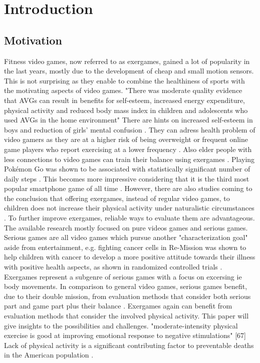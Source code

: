 \chapter{Introduction}
\label{ch:introduction}


\section{Motivation}
Fitness video games, now referred to as exergames, gained a lot of popularity in the last years, mostly due to the development of cheap and small motion sensors. This is not surprising as they enable to combine the healthiness of sports with the motivating aspects of video games.
"There was moderate quality evidence that AVGs can result in benefits for self-esteem, increased energy expenditure, physical activity and reduced body mass index in children and adolescents who used AVGs in the home environment" \cite{santos2020active}
There are hints on increased self-esteem in boys and reduction of girls’ mental confusion \cite{andrade2020effect}.
They can adress health problem of video gamers as they are at a higher risk of being overweight \cite{melchior2014internet} or frequent online game players who report exercising at a lower frequency \cite{kowert2014unpopular}. Also elder people with less connections to video games can train their balance using exergames \cite{lai2013effects}. Playing Pokémon Go was shown to be associated with statistically significant number of daily steps \cite{khamzina2019impact}. This becomes more impressive considering that it is the third most popular smartphone game of all time \cite{link_pokemongo}. However, there are also studies coming to the conclusion that offering exergames, instead of regular video games, to children does not increase their physical activity under naturalistic circumstances \cite{baranowski2012impact}. 
To further improve exergames, reliable ways to evaluate them are advantageous. The available research mostly focused on pure videos games and serious games. Serious games are all video games which pursue another "characterization goal" aside from entertainment, e.g. fighting cancer cells in Re-Mission \cite{link_remission} was shown to help children with cancer to develop a more positive attitude towards their illness with positive health aspects, as shown in randomized controlled trials \cite{kato2008video}.
Exergames represent a subgenre of serious games with a focus on excersing ie body movements. In comparison to general video games, serious games benefit, due to their double mission, from evaluation methods that consider both serious part and game part plus their balance \cite{caserman2020quality}. Exergames again can benefit from evaluation methods that consider the involved physical activity. This paper will give insights to the possibilities and challenges.
"moderate-intensity physical exercise is good at improving emotional response to negative stimulations" [67]
Lack of physical activity is a significant contributing factor to preventable deaths in the American population \cite{bauer2014prevention}.

